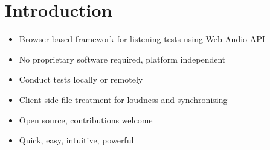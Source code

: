 \vspace{-0.8cm}
\section{Introduction}

\begin{itemize}%
	\item Browser-based framework for listening tests using Web Audio API
	\item No proprietary software required, platform independent
	\item Conduct tests locally or remotely
	\item Client-side file treatment for loudness and synchronising
	\item Open source, contributions welcome
	\item Quick, easy, intuitive, powerful
\end{itemize}
